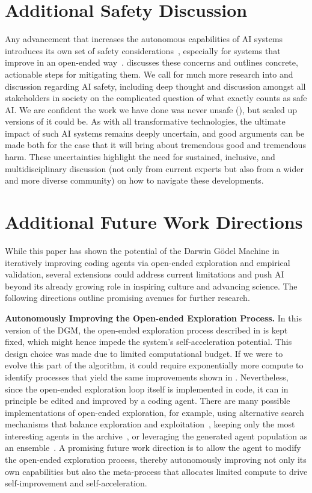 \documentclass{article} %
\begin{document}
\section{Additional Safety Discussion}
\label{app:safety}

Any advancement that increases the autonomous capabilities of AI systems introduces its own set of safety considerations~\citep{bengio2024managing}, especially for systems that improve in an open-ended way~\citep{ecoffet2020open, clune2019ai}.  discusses these concerns and outlines concrete, actionable steps for mitigating them. We call for much more research into and discussion regarding AI safety, including deep thought and discussion amongst all stakeholders in society on the complicated question of what exactly counts as safe AI. We are confident the work we have done was never unsafe (), but scaled up versions of it could be. As with all transformative technologies, the ultimate impact of such AI systems remains deeply uncertain, and good arguments can be made both for the case that it will bring about tremendous good and tremendous harm. These uncertainties highlight the need for sustained, inclusive, and multidisciplinary discussion (not only from current experts but also from a wider and more diverse community) on how to navigate these developments.

\section{Additional Future Work Directions}
\label{app:future-work}

While this paper has shown the potential of the Darwin G\"odel Machine in iteratively improving coding agents via open‐ended exploration and empirical validation, several extensions could address current limitations and push AI beyond its already growing role in inspiring culture and advancing science. The following directions outline promising avenues for further research.

\textbf{Autonomously Improving the Open-ended Exploration Process.}
In this version of the DGM, the open-ended exploration process described in  is kept fixed, which might hence impede the system's self-acceleration potential. This design choice was made due to limited computational budget. If we were to evolve this part of the algorithm, it could require exponentially more compute to identify processes that yield the same improvements shown in . Nevertheless, since the open-ended exploration loop itself is implemented in code, it can in principle be edited and improved by a coding agent. There are many possible implementations of open-ended exploration, for example, using alternative search mechanisms that balance exploration and exploitation~\citep{herr2025llm}, keeping only the most interesting agents in the archive~\citep{faldor2025omni}, or leveraging the generated agent population as an ensemble~\citep{samvelyan2024rainbow}. A promising future work direction is to allow the agent to modify the open-ended exploration process, thereby autonomously improving not only its own capabilities but also the meta-process that allocates limited compute to drive self-improvement and self-acceleration.
\end{document}
